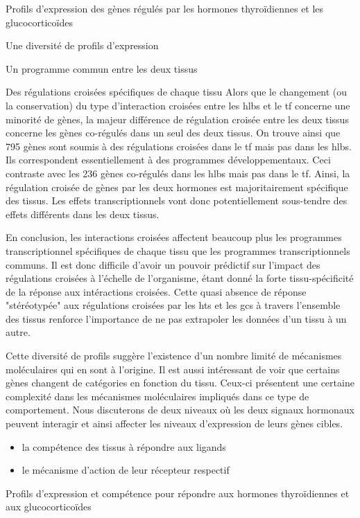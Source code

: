 \documentclass[../main.tex]{subfiles}
\begin{document}
\begin{chapter}{Profils d'expression des gènes régulés par les hormones thyroïdiennes et les glucocorticoïdes}
\begin{section}{Une diversité de profils d'expression}
\begin{subsection}{Un programme commun entre les deux tissus}
\begin{subsubsection}{Des régulations croisées spécifiques de chaque tissu}
Alors que le changement (ou la conservation) du type d'interaction croisées entre les \glspl{hlb} et le \gls{tf} concerne une minorité de gènes, la majeur différence de régulation croisée entre les deux tissus concerne les gènes co-régulés dans un seul des deux tissus.
On trouve ainsi que 795 gènes sont soumis à des régulations croisées dans le \gls{tf} mais pas dans les \glspl{hlb}.
Ils correspondent essentiellement à des programmes développementaux.
Ceci contraste avec les 236 gènes co-régulés dans les \glspl{hlb} mais pas dans le \gls{tf}.
Ainsi, la régulation croisée de gènes par les deux hormones est majoritairement spécifique des tissus.
Les effets transcriptionnels vont donc potentiellement sous-tendre des effets différents dans les deux tissus.
\end{subsubsection}

En conclusion, les interactions croisées affectent beaucoup plus les programmes transcriptionnel spécifiques de chaque tissu que les programmes transcriptionnels communs.
Il est donc difficile d'avoir un pouvoir prédictif sur l'impact des régulations croisées à l'échelle de l'organisme, étant donné la forte tissu-spécificité de la réponse aux intéractions croisées.
Cette quasi absence de réponse "stéréotypée" aux régulations croisées par les \glspl{ht} et les \glspl{gc} à travers l'ensemble des tissus renforce l'importance de ne pas extrapoler les données d'un tissu à un autre.
\par
Cette diversité de profils suggère l'existence d'un nombre limité de mécanismes moléculaires qui en sont à l'origine.
Il est aussi intéressant de voir que certains gènes changent de catégories en fonction du tissu.
Ceux-ci présentent une certaine complexité dans les mécanismes moléculaires impliqués dans ce type de comportement.
Nous discuterons de deux niveaux où les deux signaux hormonaux peuvent interagir et ainsi affecter les niveaux d'expression de leurs gènes cibles.
\begin{itemize}
\item la compétence des tissus à répondre aux ligands
\item le mécanisme d'action de leur récepteur respectif
\end{itemize}
\end{subsection}


\begin{subsection}{Profils d'expression et compétence pour répondre aux hormones thyroïdiennes et aux glucocorticoïdes}


\end{subsection}
\end{section}
\end{chapter}
\end{document}
